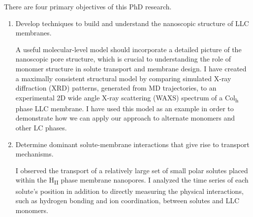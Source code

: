 \documentclass{article}
\begin{document}
  \noindent There are four primary objectives of this PhD research.
  \begin{enumerate}
  
    \item Develop techniques to build and understand the nanoscopic structure
    of LLC membranes.


    A useful molecular-level model should incorporate a detailed picture 
    of the nanoscopic pore structure, which is crucial to understanding
    the role of monomer structure in solute transport and membrane design.
    I have created a maximally consistent structural model by comparing 
    simulated X-ray diffraction (XRD) patterns, generated from MD trajectories,
    to an experimental 2D wide angle X-ray scattering (WAXS) spectrum of a 
    Col\textsubscript{h} phase LLC membrane. I have used this model as an 
    example in order to 
    demonstrate how 
    we can apply our approach
    to alternate monomers and other LC phases. 


%    
    
    \item Determine dominant solute-membrane interactions that give rise to
    transport mechanisms.
    
    I observed the transport of a relatively large set of small polar solutes
    placed within the H\textsubscript{II} phase membrane nanopores. I analyzed
    the time series of each solute's position in addition to directly measuring
    the physical interactions, such as hydrogen bonding and ion coordination, 
    between solutes and LLC monomers.
    

\end{enumerate}
\end{document}
